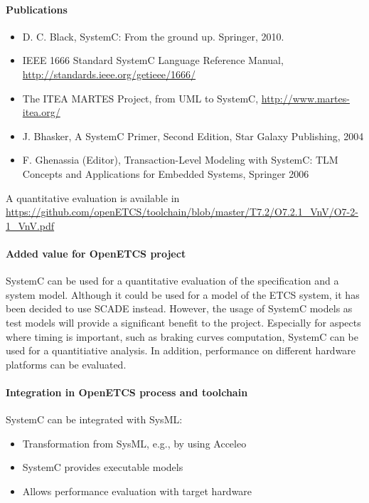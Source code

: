 \paragraph{Publications} 

\begin{itemize}
\item D. C. Black, SystemC: From the ground up. Springer, 2010.
\item IEEE 1666 Standard SystemC Language Reference Manual, \url{http://standards.ieee.org/getieee/1666/}
\item The ITEA MARTES Project, from UML to SystemC, \url{http://www.martes-itea.org/}
\item J. Bhasker, A SystemC Primer, Second Edition, Star Galaxy Publishing, 2004
\item F. Ghenassia (Editor), Transaction-Level Modeling with SystemC: TLM Concepts and
Applications for Embedded Systems, Springer 2006
\end{itemize}


A quantitative evaluation is available in \url{https://github.com/openETCS/toolchain/blob/master/T7.2/O7.2.1_VnV/O7-2-1_VnV.pdf}

\paragraph{Added value for OpenETCS project}

SystemC can be used for a quantitative evaluation of the specification and a system model. Although it could be used for a model of the ETCS system, it has been decided to use SCADE instead. However, the usage of SystemC models as test models will provide a significant benefit to the project. Especially for aspects where timing is important, such as braking curves computation, SystemC can be used for a quantitiative analysis. In addition, performance on different hardware platforms can be evaluated.

\paragraph{Integration in OpenETCS process and toolchain}

SystemC can be integrated with SysML:

\begin{itemize}
\item Transformation from SysML, e.g., by using Acceleo
\item SystemC provides executable models
\item Allows performance evaluation with target hardware
\end{itemize}

